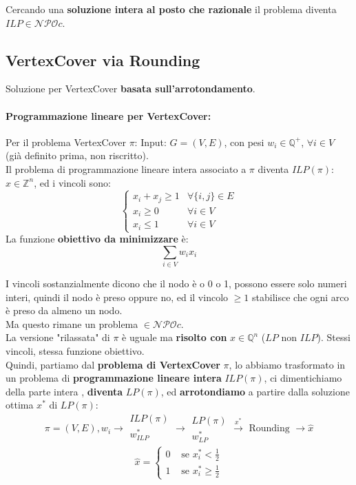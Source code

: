 Cercando una\textbf{ soluzione intera al posto che razionale} il problema diventa $ILP \in \mathcal{NPO}c$.\\

\newpage

\subsection{VertexCover via Rounding}
Soluzione per VertexCover \textbf{basata sull'arrotondamento}.\\

\paragraph{Programmazione lineare per VertexCover:} Per il problema VertexCover $\pi$: Input: $G = (V,E)$, con pesi $w_i \in \mathbb{Q}^+$, $\forall i \in V$ (già definito prima, non riscritto). \\

Il problema di programmazione lineare intera associato a $\pi$ diventa $ILP(\pi)$: $x \in \mathbb{Z}^n$, ed i vincoli sono: 
$$
\begin{cases}
	x_i + x_j \geq 1 & \forall \{i,j\} \in E \\
	x_i \geq 0 & \forall i \in V \\
	x_i \leq 1 & \forall i \in V
\end{cases}
$$
La funzione \textbf{obiettivo da minimizzare} è:
$$ \sum_{i \in V} w_i x_i $$

I vincoli sostanzialmente dicono che il nodo è o 0 o 1, possono essere solo numeri interi, quindi il nodo è preso oppure no, ed il vincolo $\geq 1$ stabilisce che ogni arco è preso da almeno un nodo. \\
Ma questo rimane un problema $ \in \mathcal{NPO}c$.\\

La versione "rilassata" di $\pi$ è uguale ma \textbf{risolto con} $x \in \mathbb{Q}^n$ ($LP$ non $ILP$). Stessi vincoli, stessa funzione obiettivo.\\

Quindi, partiamo dal \textbf{problema di VertexCover} $\pi$, lo abbiamo trasformato in un problema di \textbf{programmazione lineare intera} $ILP(\pi)$, ci dimentichiamo della parte intera , \textbf{diventa} $LP(\pi)$, ed \textbf{arrotondiamo} a partire dalla soluzione ottima $x^\ast$ di $LP(\pi)$: 
$$ \pi = (V,E), w_i  \xrightarrow[]{} 
\begin{array}{c}
	ILP(\pi) \\
	w^\ast_{ILP} \\
\end{array}
\xrightarrow[]{}
\begin{array}{c}
	LP(\pi) \\
	w^\ast_{LP}
\end{array}
\xrightarrow{x^\ast}
\text{ Rounding }
\xrightarrow{}
\hat{x}
$$
$$ 
\hat{x} = \begin{cases}
	0 & \text{ se } x^\ast_i <  \frac{1}{2} \\ 
	1 & \text{ se } x^\ast_i \geq  \frac{1}{2} 
\end{cases}
$$

